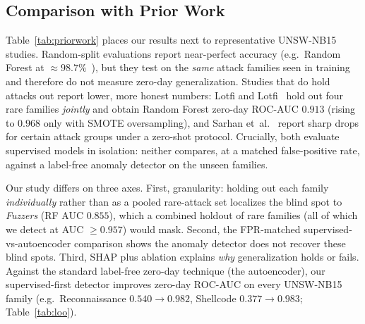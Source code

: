 \documentclass[conference]{IEEEtran}
\begin{document}
\subsection{Comparison with Prior Work}\label{sec:priorwork}
Table~\ref{tab:priorwork} places our results next to representative UNSW-NB15 studies.
Random-split evaluations report near-perfect accuracy (e.g.\ Random Forest at
$\approx 98.7\%$~\cite{kasongo_unsw}), but they test on the \emph{same} attack families
seen in training and therefore do not measure zero-day generalization. Studies that do
hold attacks out report lower, more honest numbers: Lotfi and Lotfi~\cite{lotfi_zeroday}
hold out four rare families \emph{jointly} and obtain Random Forest zero-day ROC-AUC
$0.913$ (rising to $0.968$ only with SMOTE oversampling), and Sarhan
et~al.~\cite{sarhan_zeroshot} report sharp drops for certain attack groups under a
zero-shot protocol. Crucially, both evaluate supervised models in isolation: neither
compares, at a matched false-positive rate, against a label-free anomaly detector on the
unseen families.

Our study differs on three axes. First, granularity: holding out each family
\emph{individually} rather than as a pooled rare-attack set localizes the blind spot to
\emph{Fuzzers} (RF AUC $0.855$), which a combined holdout of rare families
(all of which we detect at AUC $\geq 0.957$) would mask. Second, the FPR-matched
supervised-vs-autoencoder comparison shows the anomaly detector does not recover these
blind spots. Third, SHAP plus ablation explains \emph{why} generalization holds or fails.
Against the standard label-free zero-day technique (the autoencoder), our supervised-first
detector improves zero-day ROC-AUC on every UNSW-NB15 family (e.g.\ Reconnaissance
$0.540\!\to\!0.982$, Shellcode $0.377\!\to\!0.983$; Table~\ref{tab:loo}).

\begin{table}[t]
\caption{Positioning against representative UNSW-NB15 prior work. ID = in-distribution
(random split); LOO = leave-one-family-out. ``AE cmp.''\ = matched comparison against a
label-free autoencoder.}
\label{tab:priorwork}
\centering
\setlength{\tabcolsep}{4pt}
\end{table}
\end{document}
